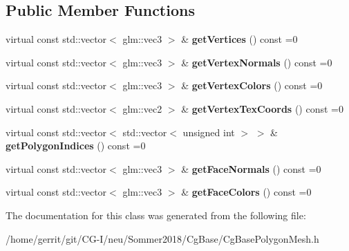 \subsection*{Public Member Functions}
\begin{DoxyCompactItemize}
\item 
\mbox{\label{class_cg_base_polygon_mesh_aebb5f90bcf96b3bd5b914592f93b35d0}} 
virtual const std\+::vector$<$ glm\+::vec3 $>$ \& {\bfseries get\+Vertices} () const =0
\item 
\mbox{\label{class_cg_base_polygon_mesh_acb2353e87758787bea7a000a43af1090}} 
virtual const std\+::vector$<$ glm\+::vec3 $>$ \& {\bfseries get\+Vertex\+Normals} () const =0
\item 
\mbox{\label{class_cg_base_polygon_mesh_accf6f440a84487521898bac05f89c0be}} 
virtual const std\+::vector$<$ glm\+::vec3 $>$ \& {\bfseries get\+Vertex\+Colors} () const =0
\item 
\mbox{\label{class_cg_base_polygon_mesh_a438a43839f5769dd75f77a4e9c3979a5}} 
virtual const std\+::vector$<$ glm\+::vec2 $>$ \& {\bfseries get\+Vertex\+Tex\+Coords} () const =0
\item 
\mbox{\label{class_cg_base_polygon_mesh_a7263c8e3e24ab6d704752f1a31cca828}} 
virtual const std\+::vector$<$ std\+::vector$<$ unsigned int $>$ $>$ \& {\bfseries get\+Polygon\+Indices} () const =0
\item 
\mbox{\label{class_cg_base_polygon_mesh_a716812ae1c8e94325ac2b5e3b7ee367f}} 
virtual const std\+::vector$<$ glm\+::vec3 $>$ \& {\bfseries get\+Face\+Normals} () const =0
\item 
\mbox{\label{class_cg_base_polygon_mesh_a6121b4b8229452e312d823b5c6fd2c05}} 
virtual const std\+::vector$<$ glm\+::vec3 $>$ \& {\bfseries get\+Face\+Colors} () const =0
\end{DoxyCompactItemize}


The documentation for this class was generated from the following file\+:\begin{DoxyCompactItemize}
\item 
/home/gerrit/git/\+C\+G-\/\+I/neu/\+Sommer2018/\+Cg\+Base/Cg\+Base\+Polygon\+Mesh.\+h\end{DoxyCompactItemize}
